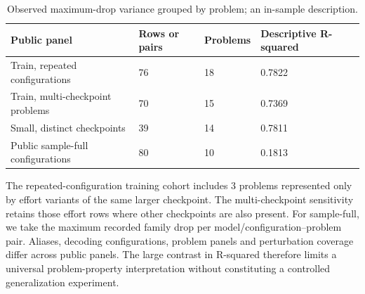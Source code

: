 \begin{table}[htbp]

\caption{Observed maximum-drop variance grouped by problem; an in-sample description.}

\label{tab:4}

\small

\begin{tabularx}{\linewidth}{@{}YYYY@{}}

\toprule

\textbf{Public panel} & \textbf{Rows or pairs} & \textbf{Problems} & \textbf{Descriptive R-squared} \\

\midrule

Train, repeated configurations & 76 & 18 & 0.7822 \\

Train, multi-checkpoint problems & 70 & 15 & 0.7369 \\

Small, distinct checkpoints & 39 & 14 & 0.7811 \\

Public sample-full configurations & 80 & 10 & 0.1813 \\

\bottomrule

\end{tabularx}

\end{table}

The repeated-configuration training cohort includes 3 problems represented only by effort variants of the same larger checkpoint. The multi-checkpoint sensitivity retains those effort rows where other checkpoints are also present. For sample-full, we take the maximum recorded family drop per model/configuration--problem pair. Aliases, decoding configurations, problem panels and perturbation coverage differ across public panels. The large contrast in R-squared therefore limits a universal problem-property interpretation without constituting a controlled generalization experiment.



